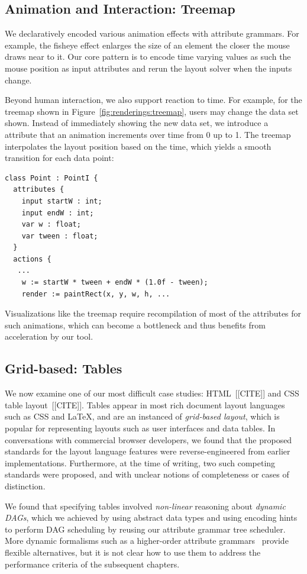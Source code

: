 \subsection{Animation and Interaction: Treemap}
We declaratively encoded various animation effects with attribute grammars. For example, the fisheye effect enlarges the size of an element the closer the mouse draws near to it. Our core pattern is to encode time varying values as such the mouse position as input attributes and rerun the layout solver when the inputs change.

Beyond human interaction, we also support reaction to time. For example, for the treemap shown in Figure~\ref{fig:renderings:treemap}, users may change the data set shown. Instead of immediately showing the new data set, we introduce a  attribute that an animation increments over time from 0 up to 1. The treemap interpolates the layout position based on the time, which yields a smooth transition for each data point:
\begin{lstlisting}
class Point : PointI {
  attributes {
    input startW : int;
    input endW : int;
    var w : float;
    var tween : float;
  }
  actions {
   ...
    w := startW * tween + endW * (1.0f - tween);
    render := paintRect(x, y, w, h, ...
\end{lstlisting}
Visualizations like the treemap require recompilation of most of the attributes for such animations, which can become a bottleneck and thus benefits from acceleration by our tool.

\subsection{Grid-based: Tables}
We now examine one of our most difficult case studies: HTML~[[CITE]] and CSS table layout~[[CITE]]. Tables appear in  most rich document layout languages such as CSS and \LaTeX, and are an instanced of \emph{grid-based layout}, which is popular for representing layouts such as user interfaces and data tables. In conversations with commercial browser developers, we found that the proposed standards for the layout language features were reverse-engineered from earlier implementations. Furthermore, at the time of writing, two such competing standards were proposed, and with unclear notions of completeness or cases of distinction.

We found that specifying tables involved \emph{non-linear} reasoning about \emph{dynamic DAGs}, which we achieved by using abstract data types and  using encoding hints to perform DAG scheduling by reusing our attribute grammar tree scheduler. More dynamic formalisms such as a higher-order attribute grammars~\cite{??} provide flexible alternatives, but it is not clear how to use them to address the performance criteria of the subsequent chapters.

